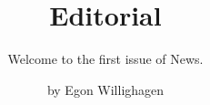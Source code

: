 \title{Editorial}
\subtitle{Welcome to the first issue of \WP News.}
\author{by Egon Willighagen}

\maketitle

\lipsum[1-3]

\address{Egon Willighagen\\
Maastricht University, The Netherlands\\
}
